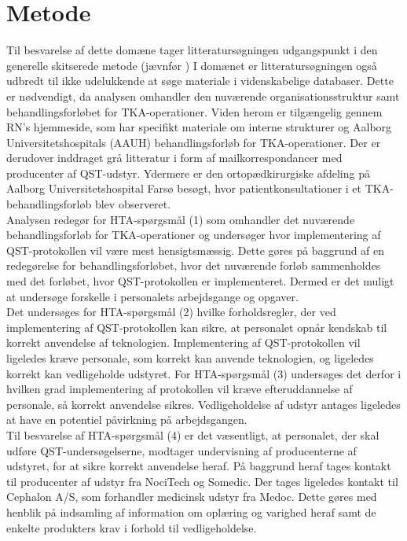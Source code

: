 \section{Metode}
Til besvarelse af dette domæne tager litteratursøgningen udgangspunkt i den generelle skitserede metode (jævnfør ) I domænet er litteratursøgningen også udbredt til ikke udelukkende at søge materiale i videnskabelige databaser. Dette er nødvendigt, da analysen omhandler den nuværende organisationsstruktur samt behandlingsforløbet for TKA-operationer. Viden herom er tilgængelig gennem RN’s hjemmeside, som har specifikt materiale om interne strukturer og Aalborg Universitetshospitals (AAUH) behandlingsforløb for TKA-operationer. Der er derudover inddraget grå litteratur i form af mailkorrespondancer med producenter af QST-udstyr. Ydermere er den ortopædkirurgiske afdeling på Aalborg Universitetshospital Farsø besøgt, hvor patientkonsultationer i et TKA-behandlingsforløb blev observeret. \\
Analysen redegør for HTA-spørgsmål (1) som omhandler det nuværende behandlingsforløb for TKA-operationer og undersøger hvor implementering af QST-protokollen vil være mest hensigtsmæssig. Dette gøres på baggrund af en redegørelse for behandlingsforløbet, hvor det nuværende forløb sammenholdes med det forløbet, hvor QST-protokollen er implementeret. Dermed er det muligt at undersøge forskelle i personalets arbejdsgange og opgaver. \\
Det undersøges for HTA-spørgsmål (2) hvilke forholdsregler, der ved implementering af QST-protokollen kan sikre, at personalet opnår kendskab til korrekt anvendelse af teknologien.
Implementering af QST-protokollen vil ligeledes kræve personale, som korrekt kan anvende teknologien, og ligeledes korrekt kan vedligeholde udstyret. For HTA-spørgsmål (3) undersøges det derfor i hvilken grad implementering af protokollen vil kræve efteruddannelse af personale, så korrekt anvendelse sikres. Vedligeholdelse af udstyr antages ligeledes at have en potentiel påvirkning på arbejdsgangen. \\
Til besvarelse af HTA-spørgsmål (4) er det væsentligt, at personalet, der skal udføre QST-undersøgelserne, modtager undervisning af producenterne af udstyret, for at sikre korrekt anvendelse heraf. På baggrund heraf tages kontakt til producenter af udstyr fra NociTech og Somedic. Der tages ligeledes kontakt til Cephalon A/S, som forhandler medicinsk udstyr fra Medoc. Dette gøres med henblik på indsamling af information om oplæring og varighed heraf samt de enkelte produkters krav i forhold til vedligeholdelse.

